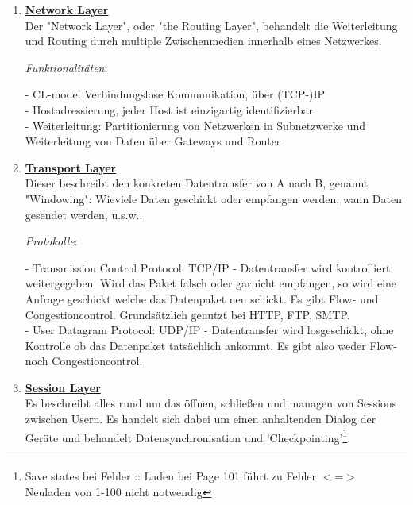 \documentclass[11pt]{article}
\begin{document}
\begin{enumerate}
        \item \textbf{\underline{Network Layer}}\\
        Der "Network Layer", oder "the Routing Layer", behandelt die Weiterleitung und
        Routing durch multiple Zwischenmedien innerhalb eines Netzwerkes.

        \emph{Funktionalitäten}:
        \begin{addmargin}[1em]{1em}
            - CL-mode: Verbindungslose Kommunikation, über (TCP-)IP\\
            - Hostadressierung, jeder Host ist einzigartig identifizierbar\\
            - Weiterleitung: Partitionierung von Netzwerken in Subnetzwerke und Weiterleitung
            von Daten über Gateways und Router\\
        \end{addmargin}

        \item \textbf{\underline{Transport Layer}}\\
        Dieser beschreibt den konkreten Datentransfer von A nach B, genannt "Windowing": Wieviele Daten geschickt oder empfangen werden,
        wann Daten gesendet werden, u.s.w..

        \emph{Protokolle}:
        \begin{addmargin}[1em]{1em}
            - Transmission Control Protocol: TCP/IP - Datentransfer wird kontrolliert weitergegeben. Wird das Paket falsch oder garnicht
            empfangen, so wird eine Anfrage geschickt welche das Datenpaket neu schickt.
            Es gibt Flow- und Congestioncontrol. Grundsätzlich genutzt bei HTTP, FTP, SMTP.\\
            - User Datagram Protocol: UDP/IP - Datentransfer wird losgeschickt, ohne Kontrolle ob das Datenpaket tatsächlich ankommt.
            Es gibt also weder Flow- noch Congestioncontrol.\\
        \end{addmargin}

        \item \textbf{\underline{Session Layer}}\\
        Es beschreibt alles rund um das öffnen, schließen und managen von Sessions zwischen Usern.
        Es handelt sich dabei um einen anhaltenden Dialog der Geräte und behandelt Datensynchronisation und 'Checkpointing'\footnote[1]{Save states bei Fehler :: Laden bei Page 101 führt zu Fehler $<$=$>$  Neuladen von 1-100 nicht notwendig}.


\end{enumerate}
\end{document}
